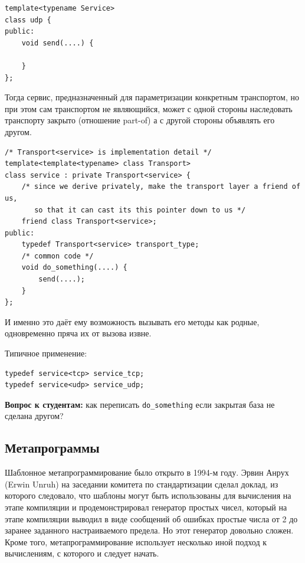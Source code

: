 \documentclass[a4paper,12pt,oneside]{article}
\newif\ifanswers
\begin{document}
\begin{lstlisting}
template<typename Service>
class udp {
public:
    void send(....) {

    }
};
\end{lstlisting}

Тогда сервис, предназначенный для параметризации конкретным транспортом, но при этом сам транспортом не являющийся, может с одной стороны наследовать транспорту закрыто (отношение part-of) а с другой стороны объявлять его другом.

\begin{lstlisting}
/* Transport<service> is implementation detail */
template<template<typename> class Transport>
class service : private Transport<service> {
    /* since we derive privately, make the transport layer a friend of us, 
       so that it can cast its this pointer down to us */
    friend class Transport<service>;
public:
    typedef Transport<service> transport_type;
    /* common code */
    void do_something(....) { 
        send(....);
    }
};
\end{lstlisting}

И именно это даёт ему возможность вызывать его методы как родные, одновременно пряча их от вызова извне.

Типичное применение:

\begin{lstlisting}
typedef service<tcp> service_tcp;
typedef service<udp> service_udp;
\end{lstlisting}

\textbf{Вопрос к студентам:} как переписать \lstinline!do_something! если закрытая база не сделана другом?

\ifanswers
Как вариант: \lstinline!transport_type::send(....);!
\fi

\pagebreak
\subsection{Метапрограммы}

Шаблонное метапрограммирование было открыто в 1994-м году. Эрвин Анрух (Erwin Unruh) на заседании комитета по стандартизации сделал доклад, из которого следовало, что шаблоны могут быть использованы для вычисления на этапе компиляции и продемонстрировал генератор простых чисел, который на этапе компиляции выводил в виде сообщений об ошибках простые числа от 2 до заранее заданного настраиваемого предела. Но этот генератор довольно сложен. Кроме того, метапрограммирование использует несколько иной подход к вычислениям, с которого и следует начать.
\end{document}
